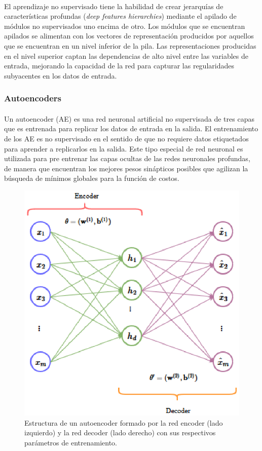 \documentclass[a4paper,12pt]{article}
\begin{document}
\paragraph{}
El aprendizaje no supervisado tiene la habilidad de crear jerarquías de características profundas (\textit{deep features hierarchies}) mediante el apilado de módulos no supervisados uno encima de otro. Los módulos que se encuentran apilados se alimentan con los vectores de representación producidos por aquellos que se encuentran en un nivel inferior de la pila. Las representaciones producidas en el nivel superior captan las dependencias de alto nivel entre las variables de entrada, mejorando la capacidad de la red para capturar las regularidades subyacentes en los datos de entrada.

\subsubsection{Autoencoders}
\paragraph{}
Un autoencoder (AE) es una red neuronal artificial no supervisada de tres capas que es entrenada para replicar los datos de entrada en la salida. El entrenamiento de los AE es no supervisado en el sentido de que no requiere datos etiquetados para aprender a replicarlos en la salida. Este tipo especial de red neuronal es utilizada para pre entrenar las capas ocultas de las redes neuronales profundas, de manera que encuentran los mejores pesos sinápticos posibles que agilizan la búsqueda de mínimos globales para la función de costos. 

\begin{figure}[ht]
  \centering
    \includegraphics{./AE.eps}
  \caption{Estructura de un autoencoder formado por la red encoder (lado izquierdo) y la red decoder (lado derecho) con sus respectivos parámetros de entrenamiento.}
  \label{fig:ae}
\end{figure}
\end{document}
